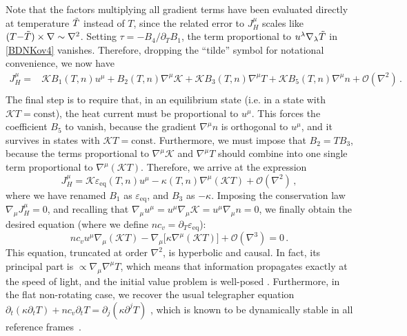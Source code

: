 \documentclass[a4paper, amsfonts, amssymb, amsmath, reprint, showkeys, nofootinbib, twoside, onecolumn,notitlepage]{revtex4-1}
\newcommand{\K}{{\mathcal{K}}}
\theoremstyle{definition}
\theoremstyle{theorem}
\begin{document}
Note that the factors multiplying all gradient terms have been evaluated directly at temperature $\Tilde{T}$ instead of $T$, since the related error to $J_H^\mu$ scales like $(T{-}\Tilde{T}) \times \nabla \sim \nabla^2$. Setting $\tau=-B_4/\partial_T B_1$, the term proportional to $u^\lambda \nabla_\lambda \Tilde{T}$ in \eqref{BDNKov4} vanishes.
Therefore, dropping the ``tilde'' symbol for notational convenience, we now have
\begin{equation}\label{BDNKov5}
\begin{split}
J^\mu_H ={}& \K B_1(T,n) u^\mu+B_2(T,n) \nabla^\mu \K   +\K B_3(T,n)\nabla^\mu T +\K B_5(T,n)\nabla^\mu n +\mathcal{O}(\nabla^2) \, .\\
\end{split}    
\end{equation}
The final step is to require that, in an equilibrium state (i.e. in a state with $\K T=\text{const}$), the heat current must be proportional to $u^\mu$. This forces the coefficient $B_5$ to vanish, because the gradient $\nabla^\mu n$ is orthogonal to $u^\mu$, and it survives in states with $\K T=\text{const}$. Furthermore, we must impose that $B_2 =TB_3$, because the terms proportional to $\nabla^\mu \K$ and $\nabla^\mu T$ should combine into one single term proportional to $\nabla^\mu(\K T)$. Therefore, we arrive at the expression
\begin{equation}\label{BDNKone}
J_H^\mu =\K \varepsilon_{\text{eq}}(T,n)u^\mu -\kappa(T,n)\nabla^\mu (\K T)+\mathcal{O}(\nabla^2) \, ,
\end{equation}
where we have renamed $B_1$ as $\varepsilon_{\text{eq}}$, and $B_3$ as $-\kappa$. Imposing the conservation law $\nabla_\mu J_H^\mu =0$, and recalling that $\nabla_\mu u^\mu =u^\mu \nabla_\mu \K=u^\mu \nabla_\mu n =0$, we finally obtain the desired equation (where we define $nc_v=\partial_T \varepsilon_{\text{eq}}$):
\begin{equation}
nc_v u^\mu \nabla_\mu (\K T)-\nabla_\mu \big[\kappa \nabla^\mu (\K T) \big]+\mathcal{O}(\nabla^3) =0 \, .
\end{equation}
This equation, truncated at order $\nabla^2$, is hyperbolic and causal. In fact, its principal part is $\propto \nabla_\mu \nabla^\mu T$, which means that information propagates exactly at the speed of light, and the initial value problem is well-posed \cite[Th. 10.1.3]{Wald}. Furthermore, in the flat non-rotating case, we recover the usual telegrapher equation $\partial_t (\kappa \partial_t T){+} nc_v \partial_t T=\partial_j (\kappa \partial^j T)$ \cite[\S 6.5.1]{rezzolla_book}, which is known to be dynamically stable in all reference frames~\cite{Hishcock1983,GavassinoCausality2021,GavassinoUniveraalityI2023odx}.
\end{document}

